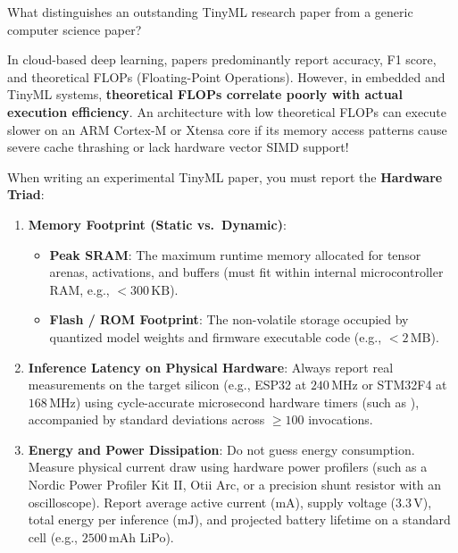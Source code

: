 \begin{iotbox}
What distinguishes an outstanding TinyML research paper from a generic computer science paper?

In cloud-based deep learning, papers predominantly report accuracy, F1 score, and theoretical FLOPs (Floating-Point Operations). However, in embedded and TinyML systems, \textbf{theoretical FLOPs correlate poorly with actual execution efficiency}. An architecture with low theoretical FLOPs can execute slower on an ARM Cortex-M or Xtensa core if its memory access patterns cause severe cache thrashing or lack hardware vector SIMD support!

When writing an experimental TinyML paper, you must report the \textbf{Hardware Triad}:
\begin{enumerate}
    \item \textbf{Memory Footprint (Static vs.\ Dynamic)}:
    \begin{itemize}
        \item \textbf{Peak SRAM}: The maximum runtime memory allocated for tensor arenas, activations, and buffers (must fit within internal microcontroller RAM, e.g., $< 300\,\text{KB}$).
        \item \textbf{Flash / ROM Footprint}: The non-volatile storage occupied by quantized model weights and firmware executable code (e.g., $< 2\,\text{MB}$).
    \end{itemize}
    \item \textbf{Inference Latency on Physical Hardware}:
    Always report real measurements on the target silicon (e.g., ESP32 at $240\,\text{MHz}$ or STM32F4 at $168\,\text{MHz}$) using cycle-accurate microsecond hardware timers (such as ), accompanied by standard deviations across $\ge 100$ invocations.
    \item \textbf{Energy and Power Dissipation}:
    Do not guess energy consumption. Measure physical current draw using hardware power profilers (such as a Nordic Power Profiler Kit II, Otii Arc, or a precision shunt resistor with an oscilloscope). Report average active current ($\text{mA}$), supply voltage ($3.3\,\text{V}$), total energy per inference ($\text{mJ}$), and projected battery lifetime on a standard cell (e.g., $2500\,\text{mAh}$ LiPo).
\end{enumerate}
\end{iotbox}

